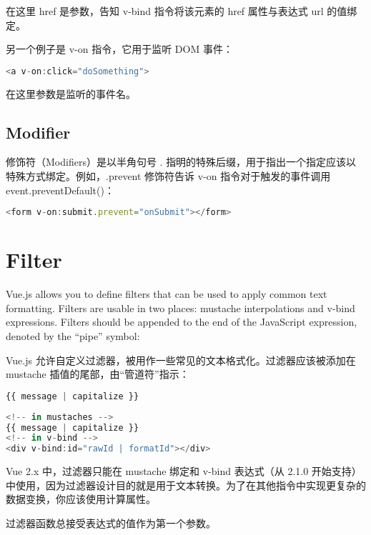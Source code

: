 在这里 href 是参数，告知 v-bind 指令将该元素的 href 属性与表达式 url 的值绑定。

另一个例子是 v-on 指令，它用于监听 DOM 事件：

\begin{lstlisting}[language=JavaScript]
<a v-on:click="doSomething">
\end{lstlisting}

在这里参数是监听的事件名。

\subsection{Modifier}

修饰符（Modifiers）是以半角句号 . 指明的特殊后缀，用于指出一个指定应该以特殊方式绑定。例如，.prevent 修饰符告诉 v-on 指令对于触发的事件调用 event.preventDefault()：

\begin{lstlisting}[language=JavaScript]
<form v-on:submit.prevent="onSubmit"></form>
\end{lstlisting}


\section{Filter}

Vue.js allows you to define filters that can be used to apply common text formatting. Filters are usable in two places: mustache interpolations and v-bind expressions. Filters should be appended to the end of the JavaScript expression, denoted by the “pipe” symbol:

Vue.js 允许自定义过滤器，被用作一些常见的文本格式化。过滤器应该被添加在 mustache 插值的尾部，由“管道符”指示：


\begin{lstlisting}[language=JavaScript]
{{ message | capitalize }}
\end{lstlisting}




\begin{lstlisting}[language=JavaScript]
<!-- in mustaches -->
{{ message | capitalize }}
<!-- in v-bind -->
<div v-bind:id="rawId | formatId"></div>
\end{lstlisting}


Vue 2.x 中，过滤器只能在 mustache 绑定和 v-bind 表达式（从 2.1.0 开始支持）中使用，因为过滤器设计目的就是用于文本转换。为了在其他指令中实现更复杂的数据变换，你应该使用计算属性。

过滤器函数总接受表达式的值作为第一个参数。



